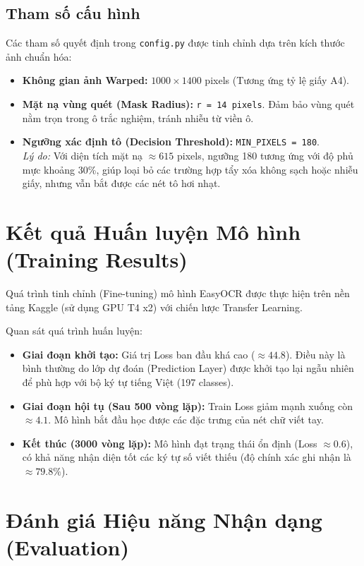 \documentclass[6pt, a4paper]{report}
\begin{document}
	\subsection{Tham số cấu hình}
	Các tham số quyết định trong \texttt{config.py} được tinh chỉnh dựa trên kích thước ảnh chuẩn hóa:
	\begin{itemize}
		\item \textbf{Không gian ảnh Warped:} $1000 \times 1400$ pixels (Tương ứng tỷ lệ giấy A4).
		\item \textbf{Mặt nạ vùng quét (Mask Radius):} \texttt{r = 14 pixels}. Đảm bảo vùng quét nằm trọn trong ô trắc nghiệm, tránh nhiễu từ viền ô.
		\item \textbf{Ngưỡng xác định tô (Decision Threshold):} \texttt{MIN\_PIXELS = 180}. 
		\\ \textit{Lý do:} Với diện tích mặt nạ $\approx 615$ pixels, ngưỡng 180 tương ứng với độ phủ mực khoảng 30\%, giúp loại bỏ các trường hợp tẩy xóa không sạch hoặc nhiễu giấy, nhưng vẫn bắt được các nét tô hơi nhạt.
	\end{itemize}
	
	\section{Kết quả Huấn luyện Mô hình (Training Results)}
	Quá trình tinh chỉnh (Fine-tuning) mô hình EasyOCR được thực hiện trên nền tảng Kaggle (sử dụng GPU T4 x2) với chiến lược Transfer Learning.
	
	Quan sát quá trình huấn luyện:
	\begin{itemize}
		\item \textbf{Giai đoạn khởi tạo:} Giá trị Loss ban đầu khá cao ($\approx 44.8$). Điều này là bình thường do lớp dự đoán (Prediction Layer) được khởi tạo lại ngẫu nhiên để phù hợp với bộ ký tự tiếng Việt (197 classes).
		\item \textbf{Giai đoạn hội tụ (Sau 500 vòng lặp):} Train Loss giảm mạnh xuống còn $\approx 4.1$. Mô hình bắt đầu học được các đặc trưng của nét chữ viết tay.
		\item \textbf{Kết thúc (3000 vòng lặp):} Mô hình đạt trạng thái ổn định (Loss $\approx 0.6$), có khả năng nhận diện tốt các ký tự số viết thiếu (độ chính xác ghi nhận là $\approx 79.8\%$).
	\end{itemize}
	
	\section{Đánh giá Hiệu năng Nhận dạng (Evaluation)}
	
\end{document}
